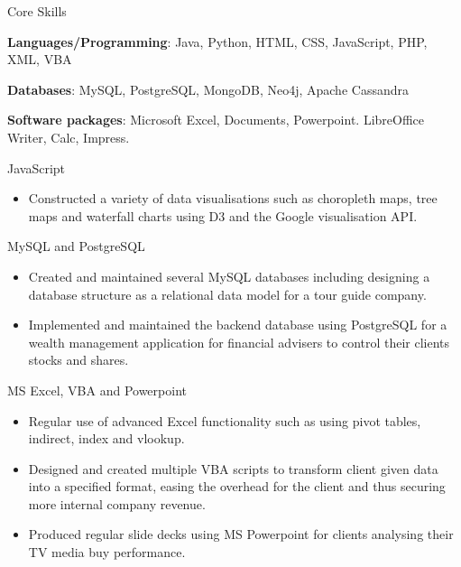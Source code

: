 \begin{cventries}
  \cventry
    {Core Skills}
    {}
    {}
    {}
    {
      \begin{cvitems}
        \item {\textbf{Languages/Programming}: Java, Python, HTML, CSS, JavaScript, PHP, XML, VBA}
        \item {\textbf{Databases}: MySQL, PostgreSQL, MongoDB, Neo4j, Apache Cassandra}
        \item {\textbf{Software packages}: Microsoft Excel, Documents, Powerpoint. LibreOffice Writer, Calc, Impress.}
        \item {JavaScript}
        \vspace{1mm}
        \begin{itemize}
        \item {Constructed a variety of data visualisations such as choropleth maps, tree maps and waterfall charts using D3 and the Google visualisation API.}
        \end{itemize}
        \item {MySQL and PostgreSQL}
        \vspace{1mm}
        \begin{itemize}
        \item {Created and maintained several MySQL databases including designing a database structure as a relational
        data model for a tour guide company.}                             \vspace{.5mm}
        \item {Implemented and maintained the backend database using PostgreSQL for a wealth management application for financial advisers to control their clients stocks and shares.}
        \end{itemize}
        \item {MS Excel, VBA and Powerpoint}
        \vspace{1mm}
        \begin{itemize}
        \item {Regular use of advanced Excel functionality such as using pivot tables, indirect, index and vlookup.}                          \vspace{.5mm}
        \item {Designed and created multiple VBA scripts to transform client given data into a specified format, easing the overhead 
              for the client and thus securing more internal company revenue.}                            \vspace{.5mm}
        \item {Produced regular slide decks using MS Powerpoint for clients analysing their TV media buy performance.}
        \end{itemize}
        \end{cvitems}
    }
\end{cventries}